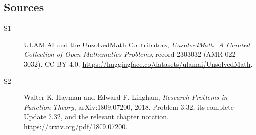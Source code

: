 \documentclass[11pt]{book}
\begin{document}
\subsection{Sources}
\begin{description}
\item[\hypertarget{source:2303032:1}{S1}] ULAM.AI and the UnsolvedMath Contributors, \emph{UnsolvedMath: A Curated Collection of Open Mathematics Problems}, record 2303032 (AMR-022-3032). CC BY 4.0. \url{https://huggingface.co/datasets/ulamai/UnsolvedMath}.
\item[\hypertarget{source:2303032:2}{S2}] Walter K. Hayman and Edward F. Lingham, \emph{Research Problems in Function Theory}, arXiv:1809.07200, 2018. Problem 3.32, its complete Update 3.32, and the relevant chapter notation. \url{https://arxiv.org/pdf/1809.07200}.
\end{description}
\label{end:2303032}
\end{document}
